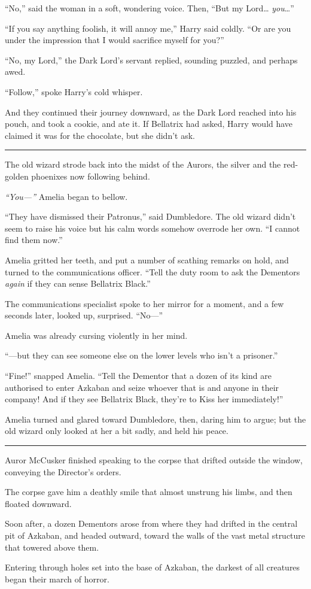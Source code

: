 ``No,'' said the woman in a soft, wondering voice. Then, ``But my
Lord\ldots{} \emph{you}\ldots{}''

``If you say anything foolish, it will annoy me,'' Harry said coldly.
``Or are you under the impression that I would sacrifice myself for
you?''

``No, my Lord,'' the Dark Lord's servant replied, sounding puzzled, and
perhaps awed.

``Follow,'' spoke Harry's cold whisper.

And they continued their journey downward, as the Dark Lord reached into
his pouch, and took a cookie, and ate it. If Bellatrix had asked, Harry
would have claimed it was for the chocolate, but she didn't ask.

\begin{center}\rule{3in}{0.4pt}\end{center}

The old wizard strode back into the midst of the Aurors, the silver and
the red-golden phoenixes now following behind.

\emph{``You---''} Amelia began to bellow.

``They have dismissed their Patronus,'' said Dumbledore. The old wizard
didn't seem to raise his voice but his calm words somehow overrode her
own. ``I cannot find them now.''

Amelia gritted her teeth, and put a number of scathing remarks on hold,
and turned to the communications officer. ``Tell the duty room to ask
the Dementors \emph{again} if they can sense Bellatrix Black.''

The communications specialist spoke to her mirror for a moment, and a
few seconds later, looked up, surprised. ``No---''

Amelia was already cursing violently in her mind.

``---but they can see someone else on the lower levels who isn't a
prisoner.''

``Fine!'' snapped Amelia. ``Tell the Dementor that a dozen of its kind
are authorised to enter Azkaban and seize whoever that is and anyone in
their company! And if they see Bellatrix Black, they're to Kiss her
immediately!''

Amelia turned and glared toward Dumbledore, then, daring him to argue;
but the old wizard only looked at her a bit sadly, and held his peace.

\begin{center}\rule{3in}{0.4pt}\end{center}

Auror McCusker finished speaking to the corpse that drifted outside the
window, conveying the Director's orders.

The corpse gave him a deathly smile that almost unstrung his limbs, and
then floated downward.

Soon after, a dozen Dementors arose from where they had drifted in the
central pit of Azkaban, and headed outward, toward the walls of the vast
metal structure that towered above them.

Entering through holes set into the base of Azkaban, the darkest of all
creatures began their march of horror.
